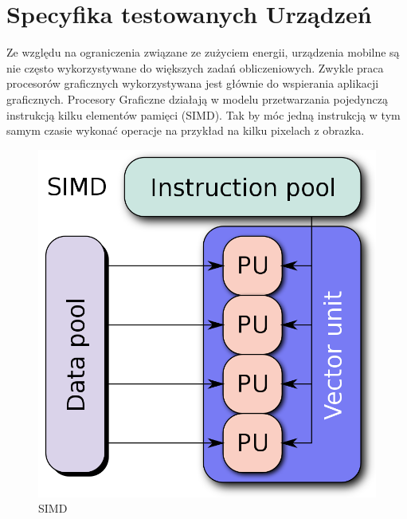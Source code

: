 \section[Specyfika testowanych Urządzeń]{Specyfika testowanych Urządzeń}
Ze względu na ograniczenia związane ze zużyciem energii, urządzenia mobilne są nie często wykorzystywane do większych zadań obliczeniowych. Zwykle praca procesorów graficznych wykorzystywana jest głównie do wspierania aplikacji graficznych. Procesory Graficzne działają w modelu przetwarzania pojedynczą instrukcją kilku elementów pamięci (SIMD). Tak by móc jedną instrukcją w tym samym czasie wykonać operacje na przykład na kilku pixelach z obrazka. 
\begin{figure}[H]
	\includegraphics[scale=0.16]{imgs/SIMD2.svg.png}
	\caption{SIMD}
\end{figure}

